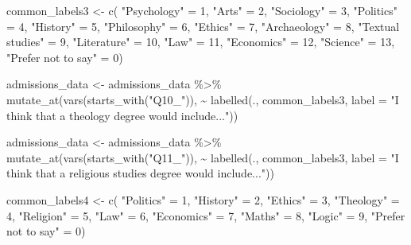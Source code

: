 \documentclass[
  letterpaper,
  DIV=11,
  numbers=noendperiod]{scrartcl}
\newenvironment{Shaded}{\begin{snugshade}}{\end{snugshade}}
\newcommand{\AttributeTok}[1]{\textcolor[rgb]{0.40,0.45,0.13}{#1}}
\newcommand{\DecValTok}[1]{\textcolor[rgb]{0.68,0.00,0.00}{#1}}
\newcommand{\FunctionTok}[1]{\textcolor[rgb]{0.28,0.35,0.67}{#1}}
\newcommand{\NormalTok}[1]{\textcolor[rgb]{0.00,0.23,0.31}{#1}}
\newcommand{\OtherTok}[1]{\textcolor[rgb]{0.00,0.23,0.31}{#1}}
\newcommand{\SpecialCharTok}[1]{\textcolor[rgb]{0.37,0.37,0.37}{#1}}
\newcommand{\StringTok}[1]{\textcolor[rgb]{0.13,0.47,0.30}{#1}}
\begin{document}
\begin{Shaded}
\begin{Highlighting}[]
\NormalTok{common\_labels3 }\OtherTok{\textless{}{-}} \FunctionTok{c}\NormalTok{(}
  \StringTok{"Psychology"} \OtherTok{=} \DecValTok{1}\NormalTok{, }\StringTok{"Arts"} \OtherTok{=} \DecValTok{2}\NormalTok{, }\StringTok{"Sociology"} \OtherTok{=} \DecValTok{3}\NormalTok{, }\StringTok{"Politics"} \OtherTok{=} \DecValTok{4}\NormalTok{, }\StringTok{"History"} \OtherTok{=} \DecValTok{5}\NormalTok{, }\StringTok{"Philosophy"} \OtherTok{=} \DecValTok{6}\NormalTok{, }\StringTok{"Ethics"} \OtherTok{=} \DecValTok{7}\NormalTok{, }\StringTok{"Archaeology"} \OtherTok{=} \DecValTok{8}\NormalTok{, }\StringTok{"Textual studies"} \OtherTok{=} \DecValTok{9}\NormalTok{, }\StringTok{"Literature"} \OtherTok{=} \DecValTok{10}\NormalTok{, }\StringTok{"Law"} \OtherTok{=} \DecValTok{11}\NormalTok{, }\StringTok{"Economics"} \OtherTok{=} \DecValTok{12}\NormalTok{, }\StringTok{"Science"} \OtherTok{=} \DecValTok{13}\NormalTok{, }\StringTok{"Prefer not to say"} \OtherTok{=} \DecValTok{0}\NormalTok{)}

\NormalTok{admissions\_data }\OtherTok{\textless{}{-}}\NormalTok{ admissions\_data }\SpecialCharTok{\%\textgreater{}\%}
  \FunctionTok{mutate\_at}\NormalTok{(}\FunctionTok{vars}\NormalTok{(}\FunctionTok{starts\_with}\NormalTok{(}\StringTok{"Q10\_"}\NormalTok{)), }\SpecialCharTok{\textasciitilde{}} \FunctionTok{labelled}\NormalTok{(., common\_labels3, }\AttributeTok{label =} \StringTok{"I think that a theology degree would include..."}\NormalTok{))}

\NormalTok{admissions\_data }\OtherTok{\textless{}{-}}\NormalTok{ admissions\_data }\SpecialCharTok{\%\textgreater{}\%}
  \FunctionTok{mutate\_at}\NormalTok{(}\FunctionTok{vars}\NormalTok{(}\FunctionTok{starts\_with}\NormalTok{(}\StringTok{"Q11\_"}\NormalTok{)), }\SpecialCharTok{\textasciitilde{}} \FunctionTok{labelled}\NormalTok{(., common\_labels3, }\AttributeTok{label =} \StringTok{"I think that a religious studies degree would include..."}\NormalTok{))}

\NormalTok{common\_labels4 }\OtherTok{\textless{}{-}} \FunctionTok{c}\NormalTok{(}
  \StringTok{"Politics"} \OtherTok{=} \DecValTok{1}\NormalTok{, }\StringTok{"History"} \OtherTok{=} \DecValTok{2}\NormalTok{, }\StringTok{"Ethics"} \OtherTok{=} \DecValTok{3}\NormalTok{, }\StringTok{"Theology"} \OtherTok{=} \DecValTok{4}\NormalTok{, }\StringTok{"Religion"} \OtherTok{=} \DecValTok{5}\NormalTok{, }\StringTok{"Law"} \OtherTok{=} \DecValTok{6}\NormalTok{, }\StringTok{"Economics"} \OtherTok{=} \DecValTok{7}\NormalTok{, }\StringTok{"Maths"} \OtherTok{=} \DecValTok{8}\NormalTok{, }\StringTok{"Logic"} \OtherTok{=} \DecValTok{9}\NormalTok{, }\StringTok{"Prefer not to say"} \OtherTok{=} \DecValTok{0}\NormalTok{)}


\end{Highlighting}
\end{Shaded}
\end{document}
